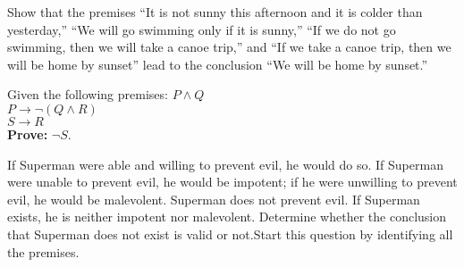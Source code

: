 \documentclass{exam}
\begin{document}
\begin{questions}
\question Show that the premises “It is not sunny this afternoon and it is colder than yesterday,” “We will
go swimming only if it is sunny,” “If we do not go swimming, then we will take a canoe trip,”
and “If we take a canoe trip, then we will be home by sunset” lead to the conclusion “We will
be home by sunset.”
\vspace{9in}


\question Given the following premises:
$ P \land Q$ \\
$ P \rightarrow \neg(Q \land R)$ \\
$ S \rightarrow R$ \\


\textbf{Prove:} $\neg S$.

\vspace{9in}


\question If Superman were able and willing to prevent evil,
he would do so. If Superman were unable to prevent evil, he would be impotent; if he were unwilling
to prevent evil, he would be malevolent. Superman
does not prevent evil. If Superman exists, he is neither impotent nor malevolent. Determine whether the conclusion that Superman does not exist is valid or not.Start this question by identifying all the premises.

\vspace{9in}




\end{questions}
\end{document}
